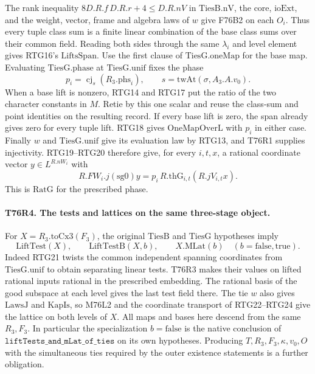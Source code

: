 The rank inequality $8D.R.f\,D.R.r+4\le D.R.nV$ in
$\mathrm{TiesB.nV}$, the core, $\mathrm{ioExt}$, and the weight,
vector, frame and algebra laws of $w$ give F76B2 on each $O_i$.
Thus every tuple class sum is a finite linear combination of the
base class sums over their common field. Reading both sides through
the same $\lambda_i$ and level element gives RTG16's
$\mathrm{LiftsSpan}$. Use the first clause of
$\mathrm{TiesG.oneMap}$ for the base map. Evaluating
$\mathrm{TiesG.phase}$ at $\mathrm{TiesG.unif}$ fixes the phase
\[
       p_i=\operatorname{cj}_{s}(R_3.\mathrm{phs}_i),\qquad
       s=\mathrm{twAt}(\sigma,A_3.A.v_0).
\]
When a base lift is nonzero, RTG14 and RTG17 put the ratio of the
two character constants in $M$. Retie by this one scalar and reuse
the class-sum and point identities on the resulting record. If
every base lift is zero, the span already gives zero for every
tuple lift. RTG18 gives $\mathrm{OneMapOverL}$ with $p_i$ in
either case. Finally $w$ and $\mathrm{TiesG.unif}$ give its
evaluation law by RTG13, and T76R1 supplies injectivity. RTG19--RTG20
therefore give, for every $i,t,x$, a rational coordinate vector
$y\in L^{R.nW_i}$ with
\[
 R.FW_i.j(\mathrm{sg0})y
       =p_i\,R.\mathrm{thG}_{i,t}(R.jV_{i,t}x).
\]
This is $\mathrm{RatG}$ for the prescribed phase.

\paragraph{T76R4. The tests and lattices on the same three-stage object.}
For $X=R_3.\mathrm{toCx3}(F_3)$, the original
$\mathrm{TiesB}$ and $\mathrm{TiesG}$ hypotheses imply
\[
  \mathrm{LiftTest}(X),\qquad
  \mathrm{LiftTestB}(X,b),\qquad X.\mathrm{MLat}(b)
    \quad (b=\mathrm{false},\mathrm{true}).
\]
Indeed RTG21 twists the common independent spanning coordinates
from $\mathrm{TiesG.unif}$ to obtain separating linear tests.
T76R3 makes their values on lifted rational inputs rational in
the prescribed embedding. The rational basis of the good subspace
at each level gives the last test field there. The tie $w$ also
gives $\mathrm{LawsJ}$ and $\mathrm{KapIs}$, so M76L2 and the
coordinate transport of RTG22--RTG24 give the lattice on both
levels of $X$. All maps and bases here descend from the same
$R_3,F_3$. In particular the specialization $b=\mathrm{false}$
is the native conclusion of
$\texttt{liftTests\_and\_mLat\_of\_ties}$ on its own hypotheses.
Producing $T,R_3,F_3,\kappa,v_0,O$ with the simultaneous ties
required by the outer existence statements is a further obligation.
